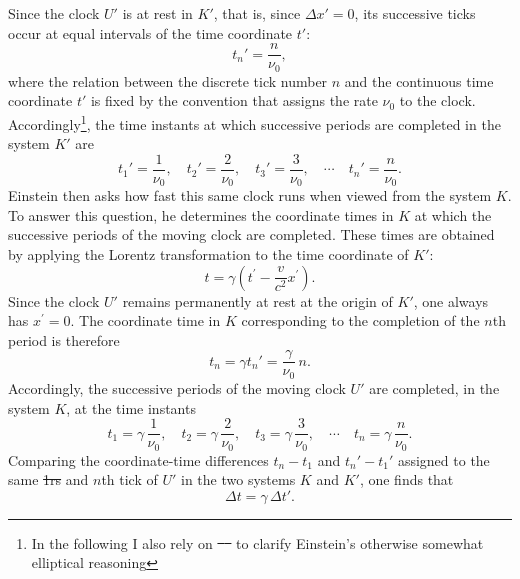 \documentclass[submitted,12pt]{article} %
\providecommand{\DIFadd}[1]{{\protect\color{blue}\uwave{#1}}} %
\providecommand{\DIFdel}[1]{{\protect\color{red}\sout{#1}}}                      %
\providecommand{\DIFaddbegin}{} %
\providecommand{\DIFaddend}{} %
\providecommand{\DIFdelbegin}{} %
\providecommand{\DIFdelend}{} %
\begin{document}
Since the clock $U'$ is at rest in $K'$, that is, since $\Delta x'=0$, its successive ticks occur at equal intervals of the time coordinate $t'$:
%
\begin{equation*}
t_n'=\frac{n}{\nu_0},
\end{equation*}
%
where the relation between the discrete tick number $n$ and the continuous time coordinate $t'$ is fixed by the convention that assigns the rate $\nu_0$ to the clock. Accordingly\footnote{In the following I also rely on \DIFdelbegin \DIFdel{\mbox{%
\citep[131\psq]{Einstein1910} }\hskip0pt%
}\DIFdelend \DIFaddbegin \DIFadd{\mbox{%
\cite[131\psq]{Einstein1910} }\hskip0pt%
}\DIFaddend to clarify Einstein’s otherwise somewhat elliptical reasoning}, the time instants at which successive periods are completed in the system $K'$ are
%
\begin{equation*}
t_1'=\frac{1}{\nu_0}, \quad
t_2'=\frac{2}{\nu_0}, \quad
t_3'=\frac{3}{\nu_0}, \quad \cdots \quad
t_n'=\frac{n}{\nu_0}.
\end{equation*}
%
Einstein then asks how fast this same clock runs when viewed from the system $K$. To answer this question, he determines the coordinate times in $K$ at which the successive periods of the moving clock are completed. These times are obtained by applying the Lorentz transformation to the time coordinate of $K'$:
%
\begin{equation*}
t=\gamma \left(t^{\prime}-\frac{v}{c^2} x^{\prime}\right).
\end{equation*}
%
Since the clock $U'$ remains permanently at rest at the origin of $K'$, one always has $x^{\prime}=0$. The coordinate time in $K$ corresponding to the completion of the $n$th period is therefore
%
\begin{equation*}
t_n=\gamma t_n'=\frac{\gamma}{\nu_0}\,n.
\end{equation*}
%
Accordingly, the successive periods of the moving clock $U'$ are completed, in the system $K$, at the time instants
%
\begin{equation*}
t_1=\gamma\,\frac{1}{\nu_0}, \quad
t_2=\gamma\,\frac{2}{\nu_0}, \quad
t_3=\gamma\,\frac{3}{\nu_0}, \quad \cdots \quad
t_n=\gamma\,\frac{n}{\nu_0}.
\end{equation*}
%
Comparing the coordinate-time differences $t_n-t_1$ and $t_n'-t_1'$ assigned to the same \DIFdelbegin \DIFdel{1rs }\DIFdelend \DIFaddbegin \DIFadd{first }\DIFaddend and $n$th tick of $U'$ in the two systems $K$ and $K'$, one finds that
%
\begin{equation*}
\Delta t=\gamma\,\Delta t'.
\end{equation*}
\end{document}
